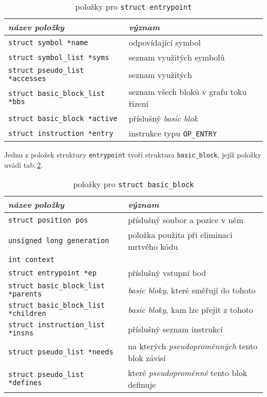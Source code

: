 \begin{table}[!h]
    \begin{center}
        \begin{tabular}{|l|l|}
            \hline
            \textsl{název položky} & \textsl{význam} \\
            \hline
        	    \texttt{struct symbol *name} & odpovídající symbol \\
            	\texttt{struct symbol\_list *syms} & seznam využitých symbolů \\
            	\texttt{struct pseudo\_list *accesses} & seznam využitých \uv{pseudoproměnných} \\
             	\texttt{struct basic\_block\_list *bbs} & seznam všech bloků v grafu toku řízení \\
                \texttt{struct basic\_block *active} & příslušný \emph{basic blok} \\
                \texttt{struct instruction *entry} & instrukce typu \texttt{OP\_ENTRY} \\
            \hline
        \end{tabular}
        \caption{položky pro \texttt{struct entrypoint}}
        \label{tab:entrypoint}
    \end{center}
\end{table}

Jednu z položek struktury \texttt{entrypoint} tvoří struktura \texttt{basic\_block},
jejíž položky uvádí tab.\,\ref{tab:basicblock}.

\begin{table}[!h]
    \begin{center}
        \begin{tabular}{|l|l|}
            \hline
            \textsl{název položky} & \textsl{význam} \\
            \hline
            	\texttt{struct position pos} & příslušný soubor a pozice v něm \\
                \texttt{unsigned long generation} & položka použita při eliminaci mrtvého kódu \\
                \texttt{int context} & \\
                \texttt{struct entrypoint *ep} & příslušný vstupní bod \\
                \texttt{struct basic\_block\_list *parents} & \emph{basic bloky}, které směřují do tohoto\\
                \texttt{struct basic\_block\_list *children} & \emph{basic bloky}, kam lze přejít z tohoto \\
	            \texttt{struct instruction\_list *insns} & příslušný seznam instrukcí \\
	            \texttt{struct pseudo\_list *needs} & na kterých \emph{pseudoproměnných} tento blok závisí \\
                \texttt{struct pseudo\_list *defines} & které \emph{pseudoproměnné} tento blok definuje\\
            \hline
        \end{tabular}
        \caption{položky pro \texttt{struct basic\_block}}
        \label{tab:basicblock}
    \end{center}
\end{table}

